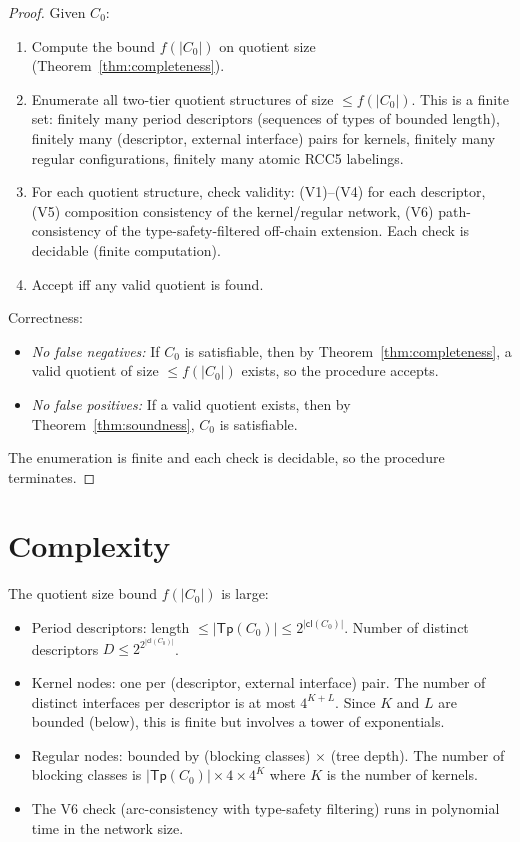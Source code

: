 \documentclass[a4paper,11pt]{article}
\theoremstyle{definition}
\newcommand{\cl}{\ensuremath{\mathsf{cl}}}
\newcommand{\Tp}{\ensuremath{\mathsf{Tp}}}
\begin{document}
\begin{proof}
Given $C_0$:
\begin{enumerate}
\item Compute the bound $f(|C_0|)$ on quotient size
  (Theorem~\ref{thm:completeness}).
\item Enumerate all two-tier quotient structures of size
  $\le f(|C_0|)$.  This is a finite set: finitely many period
  descriptors (sequences of types of bounded length), finitely many
  (descriptor, external interface) pairs for kernels,
  finitely many regular configurations, finitely many atomic RCC5
  labelings.
\item For each quotient structure, check validity: (V1)--(V4) for
  each descriptor, (V5) composition consistency of the kernel/regular
  network, (V6) path-consistency of the type-safety-filtered off-chain
  extension.  Each check is decidable (finite computation).
\item Accept iff any valid quotient is found.
\end{enumerate}

Correctness:
\begin{itemize}
\item \emph{No false negatives:} If $C_0$ is satisfiable, then by
  Theorem~\ref{thm:completeness}, a valid quotient of size
  $\le f(|C_0|)$ exists, so the procedure accepts.
\item \emph{No false positives:} If a valid quotient exists, then
  by Theorem~\ref{thm:soundness}, $C_0$ is satisfiable.
\end{itemize}

The enumeration is finite and each check is decidable, so the
procedure terminates.
\end{proof}


\section{Complexity}\label{sec:complexity}

The quotient size bound $f(|C_0|)$ is large:
\begin{itemize}
\item Period descriptors: length $\le |\Tp(C_0)| \le 2^{|\cl(C_0)|}$.
  Number of distinct descriptors $D \le 2^{2^{|\cl(C_0)|}}$.
\item Kernel nodes: one per (descriptor, external interface) pair.
  The number of distinct interfaces per descriptor is at most
  $4^{K + L}$.  Since $K$ and $L$ are bounded (below), this is
  finite but involves a tower of exponentials.
\item Regular nodes: bounded by (blocking classes) $\times$ (tree
  depth).  The number of blocking classes is
  $|\Tp(C_0)| \times 4 \times 4^K$ where $K$ is the number of
  kernels.
\item The V6 check (arc-consistency with type-safety filtering) runs
  in polynomial time in the network size.
\end{itemize}
\end{document}
